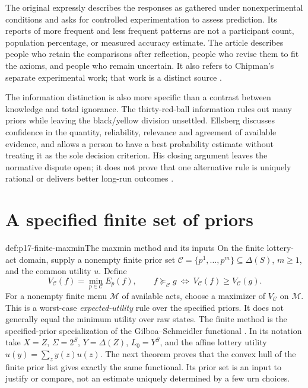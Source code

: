 The original expressly describes the responses as gathered
under nonexperimental conditions and asks for controlled
experimentation to assess prediction. Its reports of more
frequent and less frequent patterns are not a participant count,
population percentage, or measured accuracy estimate.
The article describes people who retain the comparisons after
reflection, people who revise them to fit the axioms, and people
who remain uncertain. It also refers to Chipman's separate
experimental work; that work is a distinct source
\cite[p.~651, footnotes~7--9; pp.~655--656]{Ellsberg1961Ambiguity}.

The information distinction is also more specific than a contrast
between knowledge and total ignorance. The thirty-red-ball
information rules out many priors while leaving the black/yellow
division unsettled. Ellsberg discusses confidence in the quantity,
reliability, relevance and agreement of available evidence, and
allows a person to have a best probability estimate without treating
it as the sole decision criterion. His closing argument leaves the
normative dispute open; it does not prove that one alternative rule
is uniquely rational or delivers better long-run outcomes
\cite[pp.~657--663 and 669]{Ellsberg1961Ambiguity}.

\section{A specified finite set of priors}

\begin{hbdefinition}{def:p17-finite-maxmin}{The maxmin method and its inputs}
On the finite lottery-act domain, supply a nonempty finite
prior set \(\mathcal C=\{p^1,\ldots,p^m\}\subseteq\Delta(S)\),
\(m\geq1\), and the common utility \(u\). Define
\[
                 V_{\mathcal C}(f)=
                       \min_{p\in\mathcal C}E_p(f),\qquad
 f\succeq_{\mathcal C}g
                 \ \Longleftrightarrow\
                       V_{\mathcal C}(f)\geq V_{\mathcal C}(g).
\]
For a nonempty finite menu \(\mathcal M\) of available acts,
choose a maximizer of \(V_{\mathcal C}\) on \(\mathcal M\).
This is a worst-case \emph{expected-utility} rule over the
specified priors. It does not generally equal the minimum
utility over raw states.
The finite method is the specified-prior specialization of
the Gilboa--Schmeidler functional
\cite[pp.~141--145]{GilboaSchmeidler1989Maxmin}.
In its notation take \(X=Z\), \(\Sigma=2^S\),
\(Y=\Delta(Z)\), \(L_0=Y^S\), and the affine lottery utility
\(\widehat u(y)=\sum_z y(z)u(z)\).
The next theorem proves that the convex hull of the finite
prior list gives exactly the same functional.
Its prior set is an input to justify or compare, not an estimate
uniquely determined by a few urn choices.
\end{hbdefinition}

